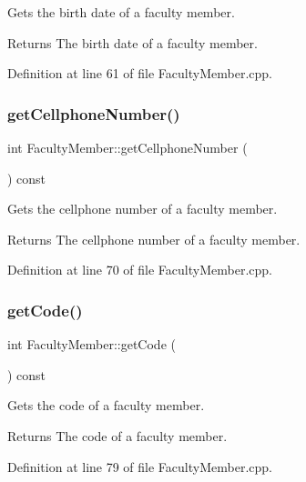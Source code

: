 Gets the birth date of a faculty member. \begin{DoxyReturn}{Returns}
The birth date of a faculty member. 
\end{DoxyReturn}


Definition at line 61 of file Faculty\+Member.\+cpp.

\mbox{\label{classFacultyMember_a865d91cdeec9e344021da0cf6c9fc29e}} 
\subsubsection{\texorpdfstring{get\+Cellphone\+Number()}{getCellphoneNumber()}}
{\footnotesize\ttfamily int Faculty\+Member\+::get\+Cellphone\+Number (\begin{DoxyParamCaption}{ }\end{DoxyParamCaption}) const}

Gets the cellphone number of a faculty member. \begin{DoxyReturn}{Returns}
The cellphone number of a faculty member. 
\end{DoxyReturn}


Definition at line 70 of file Faculty\+Member.\+cpp.

\mbox{\label{classFacultyMember_a475a9855e4587df3022c997732ef43b4}} 
\subsubsection{\texorpdfstring{get\+Code()}{getCode()}}
{\footnotesize\ttfamily int Faculty\+Member\+::get\+Code (\begin{DoxyParamCaption}{ }\end{DoxyParamCaption}) const}

Gets the code of a faculty member. \begin{DoxyReturn}{Returns}
The code of a faculty member. 
\end{DoxyReturn}


Definition at line 79 of file Faculty\+Member.\+cpp.

\mbox{\label{classFacultyMember_a31db85e875c2cfaa8a23d46ab24cf3d6}} 
